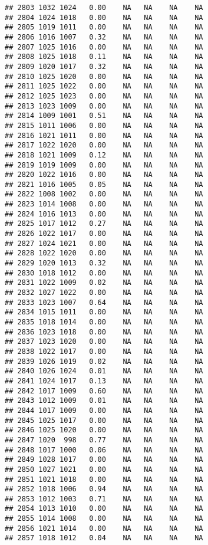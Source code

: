 \documentclass{article}\usepackage{graphicx, color}
\makeatletter
\newenvironment{kframe}{%
 \def\at@end@of@kframe{}%
 \ifinner\ifhmode%
  \def\at@end@of@kframe{\end{minipage}}%
  \begin{minipage}{\columnwidth}%
 \fi\fi%
 \def\FrameCommand##1{\hskip\@totalleftmargin \hskip-\fboxsep
 \colorbox{shadecolor}{##1}\hskip-\fboxsep
     \hskip-\linewidth \hskip-\@totalleftmargin \hskip\columnwidth}%
 \MakeFramed {\advance\hsize-\width
   \@totalleftmargin\z@ \linewidth\hsize
   \@setminipage}}%
 {\par\unskip\endMakeFramed%
 \at@end@of@kframe}
\newenvironment{knitrout}{}{} %
\makeatother
\begin{document}
\begin{knitrout}
\begin{kframe}
\begin{verbatim}
## 2803 1032 1024   0.00    NA   NA    NA    NA
## 2804 1024 1018   0.00    NA   NA    NA    NA
## 2805 1019 1011   0.00    NA   NA    NA    NA
## 2806 1016 1007   0.32    NA   NA    NA    NA
## 2807 1025 1016   0.00    NA   NA    NA    NA
## 2808 1025 1018   0.11    NA   NA    NA    NA
## 2809 1020 1017   0.32    NA   NA    NA    NA
## 2810 1025 1020   0.00    NA   NA    NA    NA
## 2811 1025 1022   0.00    NA   NA    NA    NA
## 2812 1025 1023   0.00    NA   NA    NA    NA
## 2813 1023 1009   0.00    NA   NA    NA    NA
## 2814 1009 1001   0.51    NA   NA    NA    NA
## 2815 1011 1006   0.00    NA   NA    NA    NA
## 2816 1021 1011   0.00    NA   NA    NA    NA
## 2817 1022 1020   0.00    NA   NA    NA    NA
## 2818 1021 1009   0.12    NA   NA    NA    NA
## 2819 1019 1009   0.00    NA   NA    NA    NA
## 2820 1022 1016   0.00    NA   NA    NA    NA
## 2821 1016 1005   0.05    NA   NA    NA    NA
## 2822 1008 1002   0.00    NA   NA    NA    NA
## 2823 1014 1008   0.00    NA   NA    NA    NA
## 2824 1016 1013   0.00    NA   NA    NA    NA
## 2825 1017 1012   0.27    NA   NA    NA    NA
## 2826 1022 1017   0.00    NA   NA    NA    NA
## 2827 1024 1021   0.00    NA   NA    NA    NA
## 2828 1022 1020   0.00    NA   NA    NA    NA
## 2829 1020 1013   0.32    NA   NA    NA    NA
## 2830 1018 1012   0.00    NA   NA    NA    NA
## 2831 1022 1009   0.02    NA   NA    NA    NA
## 2832 1027 1022   0.00    NA   NA    NA    NA
## 2833 1023 1007   0.64    NA   NA    NA    NA
## 2834 1015 1011   0.00    NA   NA    NA    NA
## 2835 1018 1014   0.00    NA   NA    NA    NA
## 2836 1023 1018   0.00    NA   NA    NA    NA
## 2837 1023 1020   0.00    NA   NA    NA    NA
## 2838 1022 1017   0.00    NA   NA    NA    NA
## 2839 1026 1019   0.02    NA   NA    NA    NA
## 2840 1026 1024   0.01    NA   NA    NA    NA
## 2841 1024 1017   0.13    NA   NA    NA    NA
## 2842 1017 1009   0.60    NA   NA    NA    NA
## 2843 1012 1009   0.01    NA   NA    NA    NA
## 2844 1017 1009   0.00    NA   NA    NA    NA
## 2845 1025 1017   0.00    NA   NA    NA    NA
## 2846 1025 1020   0.00    NA   NA    NA    NA
## 2847 1020  998   0.77    NA   NA    NA    NA
## 2848 1017 1000   0.06    NA   NA    NA    NA
## 2849 1028 1017   0.00    NA   NA    NA    NA
## 2850 1027 1021   0.00    NA   NA    NA    NA
## 2851 1021 1018   0.00    NA   NA    NA    NA
## 2852 1018 1006   0.94    NA   NA    NA    NA
## 2853 1012 1003   0.71    NA   NA    NA    NA
## 2854 1013 1010   0.00    NA   NA    NA    NA
## 2855 1014 1008   0.00    NA   NA    NA    NA
## 2856 1021 1014   0.00    NA   NA    NA    NA
## 2857 1018 1012   0.04    NA   NA    NA    NA

\end{verbatim}
\end{kframe}
\end{knitrout}
\end{document}
